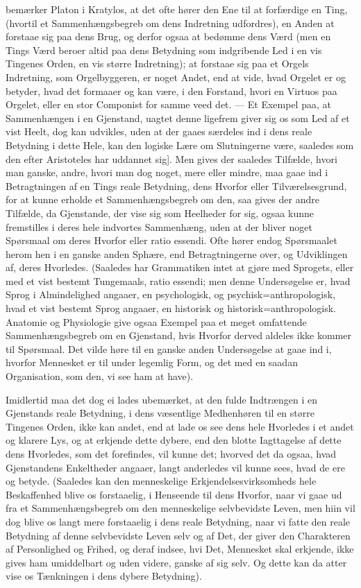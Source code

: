 \documentclass[12pt]{book}
\def\textit#1{#1}%
\def\emph#1{#1}%
\newcommand{\opage}[1]{\marginnote{\footnotesize\textit{[#1]}}}
\begin{document}
bemærker \emph{Platon i Kratylos}, at det ofte hører den Ene til at forfærdige
en Ting, (hvortil et Sammenhængsbegreb om dens Indretning udfordres), en Anden
at forstaae sig paa dens Brug, og derfor ogsaa at bedømme dens Værd (men en
Tings Værd beroer altid paa dens Betydning som indgribende Led i en vis
Tingenes Orden, en vis større Indretning); at forstaae sig paa et Orgels
Indretning, som Orgelbyggeren, er noget Andet, end at vide, hvad Orgelet er og
betyder, hvad det formaaer og kan være, i den Forstand, hvori en Virtuos paa
Orgelet, eller en stor Componist for samme veed det. --- Et Exempel paa, at
Sammenhængen i en Gjenstand, uagtet denne ligefrem giver sig os som Led af et
vist Heelt, dog kan udvikles, uden at der gaaes særdeles ind i dens reale
Betydning i dette Hele, kan den logiske Lære om Slutningerne være, saaledes som
den efter Aristoteles har uddannet sig]. Men gives der saaledes Tilfælde, hvori
man \emph{ganske}, andre, hvori
\opage{50} man dog noget, mere eller mindre, maa gaae ind i Betragtningen af en Tings
reale Betydning, dens Hvorfor eller Tilværelsesgrund, for at kunne erholde et
Sammenhængsbegreb om den, saa gives der andre Tilfælde, da Gjenstande, der vise
sig som Heelheder for sig, ogsaa kunne fremstilles i deres hele indvortes
Sammenhæng, uden at der bliver noget Spørsmaal om deres Hvorfor eller
\textit{ratio essendi}. Ofte hører endog Spørsmaalet herom hen i en ganske
anden Sphære, end Betragtningerne over, og Udviklingen af, deres Hvorledes.
(Saaledes har Grammatiken intet at gjøre med Sprogets, eller med et vist
bestemt Tungemaals, \textit{ratio essendi}; men denne Undersøgelse er, hvad
Sprog i Almindelighed angaaer, en psychologisk, og psychisk=anthropologisk,
hvad et vist bestemt Sprog angaaer, en historisk og historisk=anthropologisk.
Anatomie og Physiologie give ogsaa Exempel paa et meget omfattende
Sammenhængsbegreb om en Gjenstand, hvis Hvorfor derved aldeles ikke kommer til
Spørsmaal. Det vilde høre til en ganske anden Undersøgelse at gaae ind i,
hvorfor Mennesket er til under legemlig Form, og det med en saadan
Organisation, som den, vi see ham at have).

Imidlertid maa det dog ei lades ubemærket, at den fulde Indtrængen i en
Gjenstands reale Betydning, i dens væsentlige Medhenhøren til en større
Tingenes Orden, ikke kan andet, end at lade os see dens hele Hvorledes i et
\opage{51} andet og klarere Lys, og at erkjende dette dybere, end den blotte Iagttagelse
af dette dens Hvorledes, som det forefindes, vil kunne det; hvorved det da
ogsaa, hvad Gjenstandens Enkeltheder angaaer, langt anderledes vil kunne sees,
hvad de ere og betyde. (Saaledes kan den menneskelige
Erkjendelsesvirksomheds hele Beskaffenhed blive os forstaaelig, i Henseende til
dens Hvorfor, naar vi gaae ud fra et Sammenhængsbegreb om den menneskelige
selvbevidste Leven, men hiin vil dog blive os langt mere forstaaelig i dens
reale Betydning, naar vi fatte den reale Betydning af denne selvbevidste Leven
selv og af Det, der giver den Charakteren af Personlighed og Frihed, og deraf
indsee, hvi Det, Mennesket skal erkjende, ikke gives ham umiddelbart og uden
videre, ganske af sig selv. Og dette kan da atter vise os Tænkningen i dens
dybere Betydning).
\end{document}
